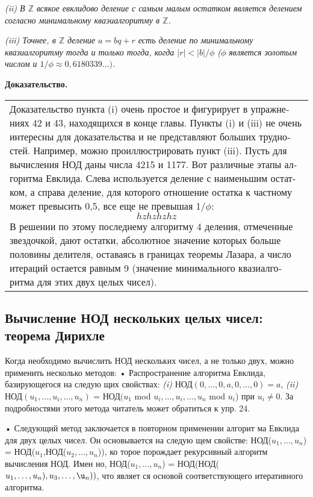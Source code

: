 \documentclass{mai_book}
\begin{document}
\textit{(ii) В $\mathbb{Z}$ всякое евклидово деление с самым малым остатком является делением согласно минимальному кваэиалгоритму в $\mathbb{Z}$.}

\textit{(iii) Точнее, в $\mathbb{Z}$ деление $a = bq+r$ есть деление по минимальному квазиалгоритму тогда и только тогда, когда $|r| < |b|/\phi$ ($\phi$ является золотым числом и $1/\phi\approx0,6180339\ldots)$.}

\textbf{Доказательство.}

\hspace*{15pt}\begin{tabular}{|p{12.5cm}}
Доказательство пункта (i) очень простое и фигурирует в упражне­
ниях 42 и 43, находящихся в конце главы. Пункты (i) и (iii) не очень
интересны для доказательства и не представляют больших трудно­
стей. Например, можно проиллюстрировать пункт (iii). Пусть для
вычисления НОД даны числа 4215 и 1177. Вот различные этапы ал­
горитма Евклида. Слева используется деление с наименьшим остат­
ком, а справа деление, для которого отношение остатка к частному
может превысить 0,5, все еще не превышая 1/$\phi$:
$$hzhzhzhz$$
В решении по этому последнему алгоритму 4 деления, отмеченные
звездочкой, дают остатки, абсолютное значение которых больше
половины делителя, оставаясь в границах теоремы Лазара, а число
итераций остается равным 9 (значение минимального квазиалго­
ритма для этих двух целых чисел).
\end{tabular}
\subsection{Вычисление НОД нескольких целых чисел: теорема Дирихле}
Когда необходимо вычислить НОД нескольких чисел, а не только двух,
можно применить несколько методов:
\newpage
• Распространение алгоритма Евклида, базирующегося на следую­
щих свойствах:
\textit{(i)} НОД$(0,\ldots, 0, a, 0 ,\ldots, 0) = a$,
\textit{(ii)} НОД$(u_{1},\ldots,u_{i},\ldots,u_{n})$ = НОД$(u_{1}$ mod $u_{i},\ldots,u_{i},\ldots,u_{n}$ mod $u_{i}$) при $u_{i}\neq0$.
За подробностями этого метода читатель может обратиться к
упр. 24.

• Следующий метод заключается в повторном применении алгорит­
ма Евклида для двух целых чисел. Он основывается на следую­
щем свойстве: НОД($u_{1},\ldots,u_{n}$) = НОД($u_{1}$,НОД($u_{2},\ldots,u_{n}$)), ко­
торое порождает рекурсивный алгоритм вычисления НОД. Имен­
но, НОД($u_{1},\ldots,u_{n}$) = НОД(НОД($u_{1},\ldots,u_{n}),u_{3},\ldots,\u_{n}))$, что являет­
ся основой соответствующего итеративного алгоритма.
\end{document}
